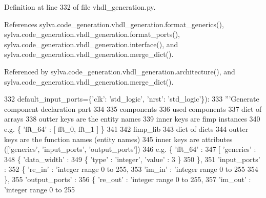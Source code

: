 Definition at line 332 of file vhdl\+\_\+generation.\+py.



References sylva.\+code\+\_\+generation.\+vhdl\+\_\+generation.\+format\+\_\+generics(), sylva.\+code\+\_\+generation.\+vhdl\+\_\+generation.\+format\+\_\+ports(), sylva.\+code\+\_\+generation.\+vhdl\+\_\+generation.\+interface(), and sylva.\+code\+\_\+generation.\+vhdl\+\_\+generation.\+merge\+\_\+dict().



Referenced by sylva.\+code\+\_\+generation.\+vhdl\+\_\+generation.\+architecture(), and sylva.\+code\+\_\+generation.\+vhdl\+\_\+generation.\+merge\+\_\+dict().


\begin{DoxyCode}
332                       default\_input\_ports=\{\textcolor{stringliteral}{'clk'}: \textcolor{stringliteral}{'std\_logic'}, \textcolor{stringliteral}{'nrst'}: \textcolor{stringliteral}{'std\_logic'}\}):
333     \textcolor{stringliteral}{'''Generate component declaration part}
334 \textcolor{stringliteral}{}
335 \textcolor{stringliteral}{      components}
336 \textcolor{stringliteral}{        used components}
337 \textcolor{stringliteral}{        dict of arrays}
338 \textcolor{stringliteral}{        outter keys are the entity names}
339 \textcolor{stringliteral}{        inner keys are fimp instances}
340 \textcolor{stringliteral}{        e.g. \{ 'fft\_64' : [ fft\_0, fft\_1 ] \}}
341 \textcolor{stringliteral}{}
342 \textcolor{stringliteral}{      fimp\_lib}
343 \textcolor{stringliteral}{        dict of dicts}
344 \textcolor{stringliteral}{        outter keys are the function names (entity names)}
345 \textcolor{stringliteral}{        inner keys are attributes (['generics', 'input\_ports', 'output\_ports'])}
346 \textcolor{stringliteral}{        e.g. \{ 'fft\_64' :}
347 \textcolor{stringliteral}{               [ 'generics' :}
348 \textcolor{stringliteral}{                 \{ 'data\_width' :}
349 \textcolor{stringliteral}{                   \{ 'type' : 'integer', 'value' : 3 \}}
350 \textcolor{stringliteral}{                 \},}
351 \textcolor{stringliteral}{                 'input\_ports' :}
352 \textcolor{stringliteral}{                 \{ 're\_in' : 'integer range 0 to 255,}
353 \textcolor{stringliteral}{                   'im\_in' : 'integer range 0 to 255}
354 \textcolor{stringliteral}{                 \},}
355 \textcolor{stringliteral}{                 'output\_ports' :}
356 \textcolor{stringliteral}{                 \{ 're\_out' : 'integer range 0 to 255,}
357 \textcolor{stringliteral}{                   'im\_out' : 'integer range 0 to 255}

\end{DoxyCode}
